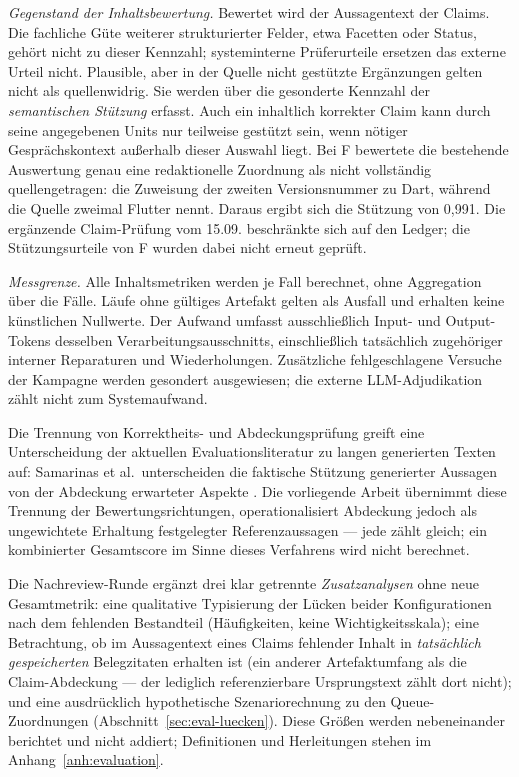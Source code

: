 \emph{Gegenstand der Inhaltsbewertung.} Bewertet wird der
Aussagentext der Claims. Die fachliche Güte weiterer strukturierter
Felder, etwa Facetten oder Status, gehört nicht zu dieser Kennzahl;
systeminterne Prüferurteile ersetzen das externe Urteil nicht.
Plausible, aber in der Quelle nicht gestützte Ergänzungen gelten
nicht als quellenwidrig. Sie werden über die gesonderte Kennzahl der
\emph{semantischen Stützung} erfasst. Auch ein inhaltlich korrekter
Claim kann durch seine angegebenen Units nur teilweise gestützt sein,
wenn nötiger Gesprächskontext außerhalb dieser Auswahl liegt.
Bei F bewertete die bestehende Auswertung genau
eine redaktionelle Zuordnung als nicht vollständig quellengetragen:
die Zuweisung der zweiten Versionsnummer zu Dart, während die Quelle
zweimal Flutter nennt. Daraus ergibt sich die Stützung von 0{,}991.
Die ergänzende Claim-Prüfung vom 15.09. beschränkte sich auf den
Ledger; die Stützungsurteile von F wurden dabei nicht erneut geprüft.

\emph{Messgrenze.} Alle Inhaltsmetriken werden je Fall berechnet,
ohne Aggregation über die Fälle. Läufe ohne gültiges Artefakt gelten
als Ausfall und erhalten keine künstlichen Nullwerte. Der Aufwand
umfasst ausschließlich Input- und Output-Tokens desselben
Verarbeitungsausschnitts, einschließlich tatsächlich zugehöriger
interner Reparaturen und Wiederholungen. Zusätzliche fehlgeschlagene
Versuche der Kampagne werden gesondert ausgewiesen; die externe
LLM-Adjudikation zählt nicht zum Systemaufwand.

Die Trennung von Korrektheits- und Abdeckungsprüfung greift eine
Unterscheidung der aktuellen Evaluationsliteratur zu langen
generierten Texten auf: Samarinas et al.\ unterscheiden die
faktische Stützung generierter Aussagen von der Abdeckung
erwarteter Aspekte
\cite{samarinas2025coverage}. Die vorliegende Arbeit übernimmt
diese Trennung der Bewertungsrichtungen, operationalisiert
Abdeckung jedoch als ungewichtete Erhaltung festgelegter
Referenzaussagen --- jede zählt gleich; ein kombinierter
Gesamtscore im Sinne dieses Verfahrens wird nicht berechnet.

Die Nachreview-Runde ergänzt drei klar getrennte
\emph{Zusatzanalysen} ohne neue Gesamtmetrik: eine qualitative
Typisierung der Lücken beider Konfigurationen nach dem fehlenden
Bestandteil (Häufigkeiten, keine Wichtigkeitsskala); eine
Betrachtung, ob im Aussagentext eines Claims fehlender Inhalt in
\emph{tatsächlich gespeicherten} Belegzitaten erhalten ist (ein
anderer Artefaktumfang als die Claim-Abdeckung --- der lediglich
referenzierbare Ursprungstext zählt dort nicht); und eine
ausdrücklich hypothetische Szenariorechnung zu den
Queue-Zuordnungen (Abschnitt~\ref{sec:eval-luecken}). Diese Größen werden
nebeneinander berichtet und nicht addiert; Definitionen und
Herleitungen stehen im Anhang~\ref{anh:evaluation}.
